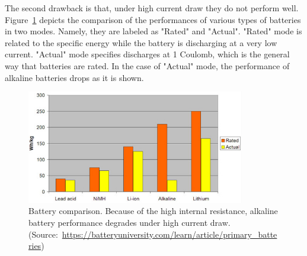 \documentclass[12pt, oneandhalf, chaparabic, sees, ms]{metu}
\begin{document}
The second drawback is that, under high current draw they do not perform well. 
Figure~\ref{fig:alkaline} depicts the comparison of the performances of various types of batteries in two modes. Namely, they are labeled as "Rated" and "Actual". 
"Rated" mode is related to the specific energy while the battery is discharging at a very low current.
"Actual" mode specifies discharges at 1 Coulomb, which is the general way that batteries are rated. In the case of "Actual" mode, the performance of alkaline batteries drops as it is shown.
% 
%
%
\begin{figure}[!htbp]
\begin{center}
  \includegraphics[width=0.85\textwidth]{alkaline.png}
   \end{center}
  \caption{Battery comparison. Because of the high internal resistance, alkaline battery performance degrades under high current draw. 
(Source:~\protect\url{https://batteryuniversity.com/learn/article/primary_batteries})}
 \label{fig:alkaline}
\end{figure}
% 
%
%
\end{document}
